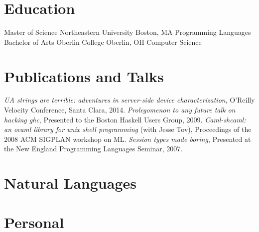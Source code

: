 \documentclass[10pt,letterpaper,sans]{moderncv}
\begin{document}

\section{Education}

        {Master of Science}
        {Northeastern University}
        {Boston, MA}
        {}
        {Programming Languages}
        {Bachelor of Arts}
        {Oberlin College}
        {Oberlin, OH}
        {}
        {Computer Science}

\section{Publications and Talks}

\cvitem{}
 {\emph{UA strings are terrible: adventures in server-side device characterization},
   O'Reilly Velocity Conference, Santa Clara, 2014.}
\cvitem{}
 {\emph{Prolegomenon to any future talk on hacking ghc},
  Presented to the Boston Haskell Users Group, 2009.}
\cvitem{}
 {\emph{Caml-shcaml: an ocaml library for unix shell programming} (with Jesse Tov),
  Proceedings of the 2008 ACM SIGPLAN workshop on ML.}
\cvitem{}
 {\emph{Session types made boring},
  Presented at the New England Programming Languages Seminar, 2007.}

\section{Natural Languages}


\section{Personal}

\end{document}
